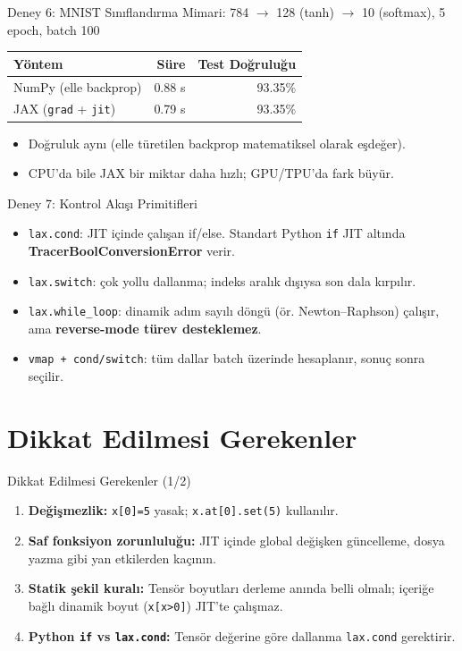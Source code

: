 \documentclass[aspectratio=169]{beamer}
\begin{document}
\begin{frame}{Deney 6: MNIST Sınıflandırma}
  Mimari: 784 $\to$ 128 (tanh) $\to$ 10 (softmax), 5 epoch, batch 100
  \begin{table}
    \small
    \begin{tabular}{@{}lrr@{}}
      \toprule
      Yöntem & Süre & Test Doğruluğu \\
      \midrule
      NumPy (elle backprop) & 0.88 s & 93.35\% \\
      JAX (\texttt{grad} + \texttt{jit}) & 0.79 s & 93.35\% \\
      \bottomrule
    \end{tabular}
  \end{table}
  \begin{itemize}
    \item Doğruluk aynı (elle türetilen backprop matematiksel olarak eşdeğer).
    \item CPU'da bile JAX bir miktar daha hızlı; GPU/TPU'da fark büyür.
  \end{itemize}
\end{frame}

\begin{frame}{Deney 7: Kontrol Akışı Primitifleri}
  \begin{itemize}
    \item \texttt{lax.cond}: JIT içinde çalışan if/else. Standart Python \texttt{if} JIT altında \textbf{TracerBoolConversionError} verir.
    \item \texttt{lax.switch}: çok yollu dallanma; indeks aralık dışıysa son dala kırpılır.
    \item \texttt{lax.while\_loop}: dinamik adım sayılı döngü (ör. Newton–Raphson) çalışır, ama \textbf{reverse-mode türev desteklemez}.
    \item \texttt{vmap + cond/switch}: tüm dallar batch üzerinde hesaplanır, sonuç sonra seçilir.
  \end{itemize}
\end{frame}

\section{Dikkat Edilmesi Gerekenler}

\begin{frame}{Dikkat Edilmesi Gerekenler (1/2)}
  \begin{enumerate}
    \item \textbf{Değişmezlik:} \texttt{x[0]=5} yasak; \texttt{x.at[0].set(5)} kullanılır.
    \item \textbf{Saf fonksiyon zorunluluğu:} JIT içinde global değişken güncelleme, dosya yazma gibi yan etkilerden kaçının.
    \item \textbf{Statik şekil kuralı:} Tensör boyutları derleme anında belli olmalı; içeriğe bağlı dinamik boyut (\texttt{x[x>0]}) JIT'te çalışmaz.
    \item \textbf{Python \texttt{if} vs \texttt{lax.cond}:} Tensör değerine göre dallanma \texttt{lax.cond} gerektirir.
  \end{enumerate}
\end{frame}
\end{document}
